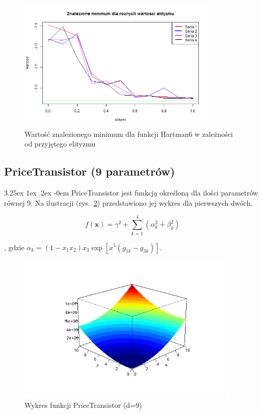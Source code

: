 \documentclass[11pt, a4paper]{article}
\makeatletter
\renewcommand\paragraph{\@startsection{paragraph}{5}{\z@}
  {3.25ex \@plus1ex \@minus.2ex}
  {-0em}
  {\normalfont\normalsize\bfseries}}
\makeatother
\begin{document}
\begin{figure}[H]
	\begin{center}
		\includegraphics[width=0.85\textwidth]{./assets/Hartman66.png}
		\caption{Wartość znalezionego minimum dla funkcji Hartman6 w zależności od przyjętego elityzmu}
		\label{fig:hartman66}
	\end{center}
\end{figure}

\newpage
\subsection{PriceTransistor (9 parametrów)}
\paragraph{}
PriceTransistor jest funkcją określoną dla ilości parametrów równej 9. Na ilustracji (rys.~\ref{fig:pricetransistor1}) przedstawiono jej wykres dla pierwszych dwóch.

\begin{equation}\label{eq:pricetransistor}
f(\boldsymbol{x}) = \gamma^2 + \sum_{k=1}^{4} ( \alpha_k^2 + \beta_k^2 )
\end{equation}

, gdzie $ \alpha_k = (1-x_1 x_2)x_3 {\exp[ x^5 (g_{1k} - g_{3k})]}$.


\begin{figure}[H]
	\begin{center}
		\includegraphics[width=0.95\textwidth]{./assets/PriceTransistor1.png}
		\caption{Wykres funkcji PriceTransistor (d=9)}
		\label{fig:pricetransistor1}
	\end{center}
\end{figure}
\end{document}
